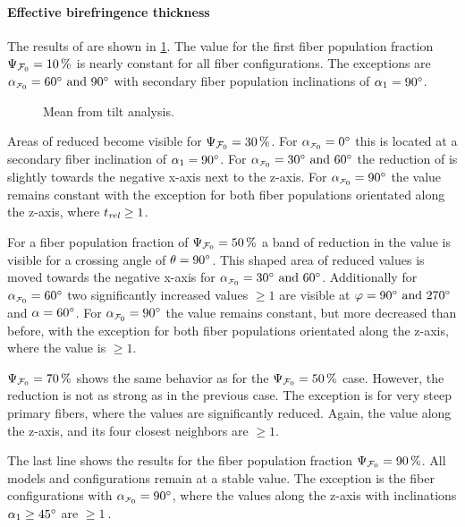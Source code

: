 \paragraph{Effective birefringence thickness \trel{}}
%
The results of \trel{} are shown in \cref{fig:sim_ana_trel}.
The \trel{} value for the first fiber population fraction $\textnormal{$\Psi_{\textnormal{$\mathcal{F}_0$}}$}=\SI{10}{\percent}$
is nearly constant for all fiber configurations.
The exceptions are $\modelInc=\SIlist{60;90}{\degree}$ with secondary fiber population inclinations of $\textnormal{$\alpha$}_1 = \SI{90}{\degree}$.
\par
%
\begin{figure}[!p]
    \centering
    \tikzset{external/export next=false}
    \caption[]{Mean \trel{} from tilt analysis.}
    \label{fig:sim_ana_trel}
\end{figure}
%
Areas of reduced \trel{} become visible for $\textnormal{$\Psi_{\textnormal{$\mathcal{F}_0$}}$}=\SI{30}{\percent}$.
For $\modelInc=\SI{0}{\degree}$ this is located at a secondary fiber inclination of $\textnormal{$\alpha$}_1 = \SI{90}{\degree}$.
For $\modelInc=\SIlist[]{30;60}{\degree}$ the reduction of \trel{} is slightly towards the negative x-axis next to the z-axis.
For $\modelInc=\SI{90}{\degree}$ the \trel{} value remains constant with the exception for both fiber populations orientated along the z-axis, where $\textnormal{$t_\mathit{rel}$} \geq 1$.
\par
%
For a fiber population fraction of $\textnormal{$\Psi_{\textnormal{$\mathcal{F}_0$}}$}=\SI{50}{\percent}$ a band of reduction in the \trel{} value is visible for a crossing angle of $\textnormal{$\theta$}=\SI{90}{\degree}$.
This  shaped area of reduced \trel{} values is moved towards the negative x-axis for $\modelInc=\SIlist{30;60}{\degree}$.
Additionally for $\modelInc=\SI{60}{\degree}$ two significantly increased \trel{} values $\geq 1$ are visible at $\dir=\SIlist{90;270}{\degree}$ and $\textnormal{$\alpha$}=\SI{60}{\degree}$.
For $\modelInc=\SI{90}{\degree}$ the \trel{} value remains constant, but more decreased than before, with the exception for both fiber populations orientated along the z-axis, where the \trel{} value is $\geq 1$.
\par
%
$\textnormal{$\Psi_{\textnormal{$\mathcal{F}_0$}}$}=\SI{70}{\percent}$ shows the same behavior as for the $\textnormal{$\Psi_{\textnormal{$\mathcal{F}_0$}}$}=\SI{50}{\percent}$ case.
However, the reduction is not as strong as in the previous case.
The exception is for very steep primary fibers, where the \trel{} values are significantly reduced.
Again, the \trel{} value along the z-axis, and its four closest neighbors are $\geq 1$.
\par
%
The last line shows the results for the fiber population fraction $\textnormal{$\Psi_{\textnormal{$\mathcal{F}_0$}}$}=\SI{90}{\percent}$.
All models and configurations remain at a stable \trel{} value.
The exception is the fiber configurations with $\modelInc=\SI{90}{\degree}$, where the \trel{} values along the z-axis with inclinations $\textnormal{$\alpha$}_1 \geq \SI{45}{\degree}$ are $\geq \SI{1}{}$.
%
%
%
